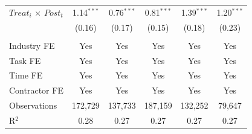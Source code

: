 \documentclass[
]{article}
\begin{document}
\begin{table}[htbp]
\begin{tabular}{lccccc}
      $Treat_i$ $\times$ $Post_t$  & 1.14$^{***}$                                                                                  & 0.76$^{***}$                                  & 0.81$^{***}$                                & 1.39$^{***}$                                                   & 1.20$^{***}$\\   
                                   & (0.16)                                                                                        & (0.17)                                        & (0.15)                                      & (0.18)                                                         & (0.23)\\   
      \midrule \\
      Industry FE                  & Yes                                                                                           & Yes                                           & Yes                                         & Yes                                                            & Yes\\  
      Task FE                      & Yes                                                                                           & Yes                                           & Yes                                         & Yes                                                            & Yes\\  
      Time FE                      & Yes                                                                                           & Yes                                           & Yes                                         & Yes                                                            & Yes\\  
      Contractor FE                & Yes                                                                                           & Yes                                           & Yes                                         & Yes                                                            & Yes\\  
      Observations                 & 172,729                                                                                       & 137,733                                       & 187,159                                     & 132,252                                                        & 79,647\\  
      R$^2$                        & 0.28                                                                                          & 0.27                                          & 0.27                                        & 0.27                                                           & 0.27\\  

\end{tabular}
\end{table}
\end{document}
